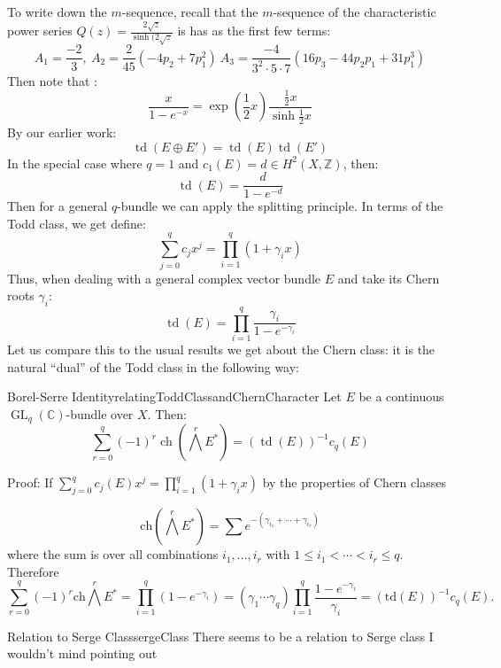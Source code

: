 \documentclass{book}
\newcommand{\C}{{\mathbb{C}}}
\newcommand{\Z}{{\mathbb{Z}}}
\newcommand{\ch}{{\operatorname{ch}}}
\newcommand{\td}{{\operatorname{td}}}
\newcommand{\GL}{{\operatorname{GL}}}
\begin{document}
To write down the $m$-sequence, recall that the $m$-sequence of the
characteristic power series $Q(z) = \frac{2\sqrt{z}}{\sinh(2\sqrt{z}}$ is has as the first few terms:
\[
  A_1 = \frac{-2}{3},\ A_2 = \frac{2}{45} (-4p_2 + 7p_1^2)\ A_3 = \frac{-4}{3^2\cdot 5\cdot 7} \left(16p_3
  - 44p_2p_1 + 31 p_1^3\right)
\]
Then note that :
\[
  \frac{x}{1-e^{-x}} = \exp \left(\frac{1}{2}x\right) \frac{\frac{1}{2}x}{\sinh \frac{1}{2}x}
\]
By our earlier work:
\[
  \td(E\oplus E') = \td(E)\td(E')
\]
In the special case where $q= 1$ and $c_1(E) = d \in H^2(X, \Z)$, then:
\[
  \td(E) = \frac{d}{1-e^{-d}}
\]
Then for a general $q$-bundle we can apply the splitting principle. In terms of the Todd class, we get
define:
\[
  \sum_{j=0}^q c_jx^j = \prod_{i=1}^q (1 + \gamma_ix)
\]
Thus, when dealing with a general complex vector bundle $E$ and take its Chern roots $\gamma_i$:
\[
  \td(E) = \prod_{i=1}^q \frac{\gamma_i}{1-e^{-\gamma_i}}
\]
Let us compare this to the usual results we get about the Chern class: it is the natural ``dual'' of the Todd
class in the following way:
\begin{thm}{Borel-Serre Identity}{relatingToddClassandChernCharacter}
  Let $E$ be a continuous $\GL_q(\C)$-bundle over $X$. Then:
  \[
    \sum_{r=0}^q (-1)^r \ch \left(\bigwedge^rE^*\right) = (\td(E))^{-1}c_q(E)
  \]
\end{thm}

\begin{Proof}
  Proof: If $\sum_{j=0}^q c_j(E) x^j = \prod_{i=1}^q (1 + \gamma_i x)$ by the properties of Chern classes

\[
    \text{ch}\left(\bigwedge^r E^*\right) = \sum e^{-(\gamma_{i_1} + \cdots + \gamma_{i_r})}
\]
where the sum is over all combinations $i_1, \ldots, i_r$ with $1 \leq i_1 < \cdots < i_r \leq q$. Therefore
\[
    \sum_{r=0}^q (-1)^r \text{ch}\bigwedge^r E^* = \prod_{i=1}^q (1-e^{-\gamma_i}) = (\gamma_1 \cdots \gamma_q) \prod_{i=1}^q \frac{1-e^{-\gamma_i}}{\gamma_i} = (\text{td}(E))^{-1} c_q(E).
\]
\end{Proof}

\begin{titledBox}{Relation to Serge Class}{sergeClass}
  There seems to be a relation to Serge class I wouldn't mind pointing out
\end{titledBox}
\end{document}
